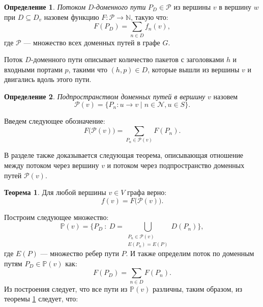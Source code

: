 \documentclass[14pt,autoref,href]{disser}
\theoremstyle{definition}
\newtheorem{definition}{Определение}
\newtheorem{theorem}{Теорема}
\begin{document}
\begin{definition}
\textit{Потоком} $D$-\textit{доменного пути} $P_D\in \mathscr{P}$ из вершины $v$ в вершину $w$ при $D\subseteq D_v$ назовем функцию $F:\mathscr{P}\rightarrow \mathbb{N}$, такую что:
\begin{equation} \label{eq:F(P_D)}
    F(P_D) = \sum_{n\in D} {f_n(v)},
\end{equation}
где $\mathscr{P}$ --- множество всех доменных путей в графе $G$.
\end{definition}

Поток $D$-доменного пути описывает количество пакетов с заголовками $h$ и входными портами $p$, такими что $(h,p)\in D$, которые вышли из вершины $v$ и двигались вдоль этого пути.

\begin{definition}
\textit{Подпространством доменных путей в вершину} $v$ назовем
\begin{equation}
    \mathcal{P}(v) = \{ P_n:u\rightarrow v \;|\; n \in\mathcal{N}, u\in S \}.
\end{equation}
\end{definition}

Введем следующее обозначение:
\begin{equation}
    F\big( \mathcal{P}(v) \big) = \sum_{P_n\in\mathcal{P}(v)}{F(P_n)}.
\end{equation}

В разделе также доказывается следующая теорема, описывающая отношение между потоком через вершину $v$ и потоком через подпространство доменных путей $\mathcal{P}(v)$.

\begin{theorem} \label{th:f_P_v}
Для любой вершины $v\in V$ графа верно:
\begin{equation}
    f(v) = F\big(\mathcal{P}(v)\big).
\end{equation}
\end{theorem}

Построим следующее множество:
\begin{equation}
    \mathbb{P}(v) = \bigg\{ P_D\ :\ D=\bigcup_{\substack{P_n\in \mathcal{P}(v) \\ E(P_n)=E(P)}}{D(P_n)} \bigg\},
\end{equation}
где $E(P)$ --- множество ребер пути $P$.
И также определим поток по доменным путям $P_D\in \mathbb{P}(v)$ как:
\begin{equation}
    F(P_D) = \sum_{n\in D}{F(P_n)}.
\end{equation}
Из построения следует, что все пути из $\mathbb{P}(v)$ различны, таким образом, из теоремы \ref{th:f_P_v} следует, что:
\end{document}
